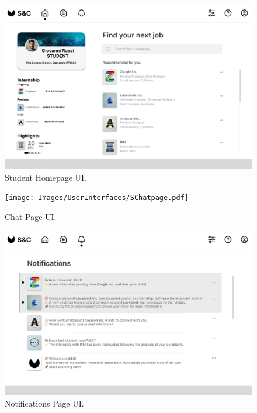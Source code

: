 \begin{figure}[H]
    \begin{center}
        \includegraphics[width=0.9\linewidth]{Images/UserInterfaces/SHomepage.pdf}
        \caption{Student Homepage UI.}        
        \label{fig:student_homepage_UI}%
    \end{center}
\end{figure}

\begin{figure}[H]
    \begin{center}
        \texttt{[image: Images/UserInterfaces/SChatpage.pdf]}
        \caption{Chat Page UI.}
        \label{fig:chat_page_UI}%
    \end{center}
\end{figure}

\begin{figure}[H]
    \begin{center}
        \includegraphics[width=\linewidth]{Images/UserInterfaces/NotificationPage.pdf}
        \caption{Notifications Page UI.}
        \label{fig:notifications_page_UI}%
    \end{center}
\end{figure}


